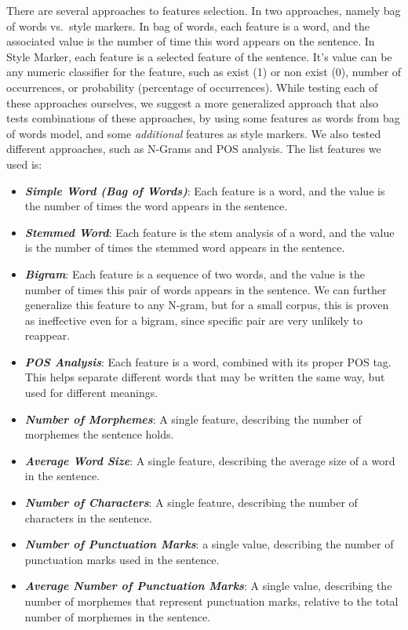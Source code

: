 \documentclass[a4paper]{article}
\begin{document}
There are several approaches to features selection. In \cite{rachel} two approaches, namely bag of words vs.\ style markers.
In bag of words, each feature is a word, and the associated value is the number of time this word appears on the sentence.
In Style Marker, each feature is a selected feature of the sentence. It's value can be any numeric classifier for the feature, such as exist (1) or non exist (0), number of occurrences, or probability (percentage of occurrences).
While testing each of these approaches ourselves, we suggest a more generalized approach that also tests combinations of these approaches, by using some features as words from bag of words model, and some \emph{additional} features as style markers.
We also tested different approaches, such as N-Grams and POS analysis. The list features we used is:
\begin{itemize}
\item \textbf{\emph{Simple Word (Bag of Words)}}: Each feature is a word, and the value is the number of times the word appears in the sentence.
\item \textbf{\emph{Stemmed Word}}: Each feature is the stem analysis of a word, and the value is the number of times the stemmed word appears in the sentence.
\item \textbf{\emph{Bigram}}: Each feature is a sequence of two words, and the value is the number of times this pair of words appears in the sentence. We can further generalize this feature to any N-gram, but for a small corpus, this is proven as ineffective even for a bigram, since specific pair are very unlikely to reappear.
\item \textbf{\emph{POS Analysis}}: Each feature is a word, combined with its proper POS tag. This helps separate different words that may be written the same way, but used for different meanings.
\item \textbf{\emph{Number of Morphemes}}: A single feature, describing the number of morphemes the sentence holds.
\item \textbf{\emph{Average Word Size}}: A single feature, describing the average size of a word in the sentence.
\item \textbf{\emph{Number of Characters}}: A single feature, describing the number of characters in the sentence.
\item \textbf{\emph{Number of Punctuation Marks}}: a single value, describing the number of punctuation marks used in the sentence.
\item \textbf{\emph{Average Number of Punctuation Marks}}: A single value, describing the number of morphemes that represent punctuation marks, relative to the total number of morphemes in the sentence.

\end{itemize}
\end{document}
